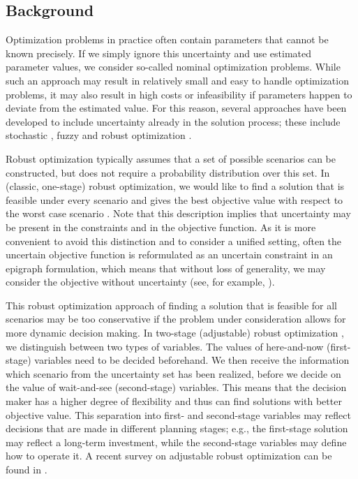 \documentclass[a4paper,abstracton]{scrartcl}
\begin{document}


\subsection{Background}

Optimization problems in practice often contain parameters that cannot be known precisely. If we simply ignore this uncertainty and use estimated parameter values, we consider so-called nominal optimization problems. While such an approach may result in relatively small and easy to handle optimization problems, it may also result in high costs or infeasibility if parameters happen to deviate from the estimated value. For this reason, several approaches have been developed to include uncertainty already in the solution process; these include stochastic \cite{powell2019unified}, fuzzy \cite{lodwick2010fuzzy} and robust optimization \cite{ben2009robust}.

Robust optimization typically assumes that a set of possible scenarios can be constructed, but does not require a probability distribution over this set. In (classic, one-stage) robust optimization, we would like to find a solution that is feasible under every scenario and gives the best objective value with respect to the worst case scenario  \cite{ben2002robust}. Note that this description implies that uncertainty may be present in the constraints and in the objective function. As it is more convenient to avoid this distinction and to consider a unified setting, often the uncertain objective function is reformulated as an uncertain constraint in an epigraph formulation, which means that without loss of generality, we may consider the objective without uncertainty (see, for example, \cite{ben2002robust}).

This robust optimization approach of finding a solution that is feasible for all scenarios may be too conservative if the problem under consideration allows for more dynamic decision making. In two-stage (adjustable) robust optimization \cite{ben2004adjustable}, we distinguish between two types of variables. The values of here-and-now (first-stage) variables need to be decided beforehand. We then receive the information which scenario from the uncertainty set has been realized, before we decide on the value of wait-and-see (second-stage) variables. This means that the decision maker has a higher degree of flexibility and thus can find solutions with better objective value. This separation into first- and second-stage variables may reflect decisions that are made in different planning stages; e.g., the first-stage solution may reflect a long-term investment, while the second-stage variables may define how to operate it. A recent survey on adjustable robust optimization can be found in \cite{yanikouglu2019survey}.
\end{document}
